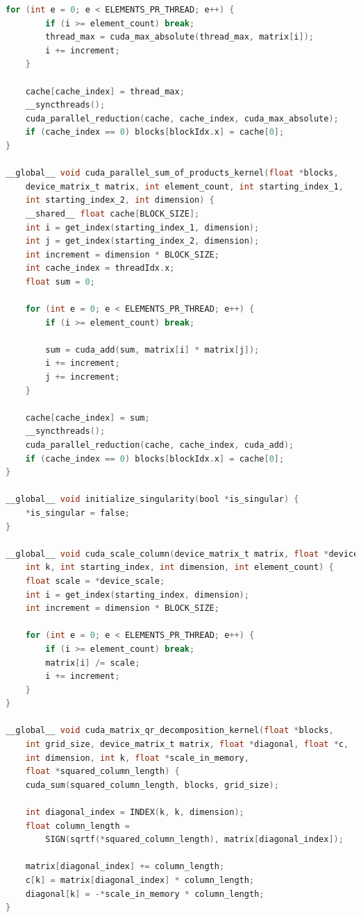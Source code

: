 \begin{lstlisting}[language=C, caption={QR Decomposition GPU Parallel Max Implementation}, label={lst:qr_gpu_parallel_max}]
    for (int e = 0; e < ELEMENTS_PR_THREAD; e++) {
        if (i >= element_count) break;
        thread_max = cuda_max_absolute(thread_max, matrix[i]);
        i += increment;
    }

    cache[cache_index] = thread_max;
    __syncthreads();
    cuda_parallel_reduction(cache, cache_index, cuda_max_absolute);
    if (cache_index == 0) blocks[blockIdx.x] = cache[0];
}

__global__ void cuda_parallel_sum_of_products_kernel(float *blocks,
    device_matrix_t matrix, int element_count, int starting_index_1,
    int starting_index_2, int dimension) {
    __shared__ float cache[BLOCK_SIZE];
    int i = get_index(starting_index_1, dimension);
    int j = get_index(starting_index_2, dimension);
    int increment = dimension * BLOCK_SIZE;
    int cache_index = threadIdx.x;
    float sum = 0;

    for (int e = 0; e < ELEMENTS_PR_THREAD; e++) {
        if (i >= element_count) break;

        sum = cuda_add(sum, matrix[i] * matrix[j]);
        i += increment;
        j += increment;
    }

    cache[cache_index] = sum;
    __syncthreads();
    cuda_parallel_reduction(cache, cache_index, cuda_add);
    if (cache_index == 0) blocks[blockIdx.x] = cache[0];
}

__global__ void initialize_singularity(bool *is_singular) {
    *is_singular = false;
}

__global__ void cuda_scale_column(device_matrix_t matrix, float *device_scale,
    int k, int starting_index, int dimension, int element_count) {
    float scale = *device_scale;
    int i = get_index(starting_index, dimension);
    int increment = dimension * BLOCK_SIZE;

    for (int e = 0; e < ELEMENTS_PR_THREAD; e++) {
        if (i >= element_count) break;
        matrix[i] /= scale;
        i += increment;
    }
}

__global__ void cuda_matrix_qr_decomposition_kernel(float *blocks,
    int grid_size, device_matrix_t matrix, float *diagonal, float *c,
    int dimension, int k, float *scale_in_memory,
    float *squared_column_length) {
    cuda_sum(squared_column_length, blocks, grid_size);

    int diagonal_index = INDEX(k, k, dimension);
    float column_length =
        SIGN(sqrtf(*squared_column_length), matrix[diagonal_index]);

    matrix[diagonal_index] += column_length;
    c[k] = matrix[diagonal_index] * column_length;
    diagonal[k] = -*scale_in_memory * column_length;
}


\end{lstlisting}
